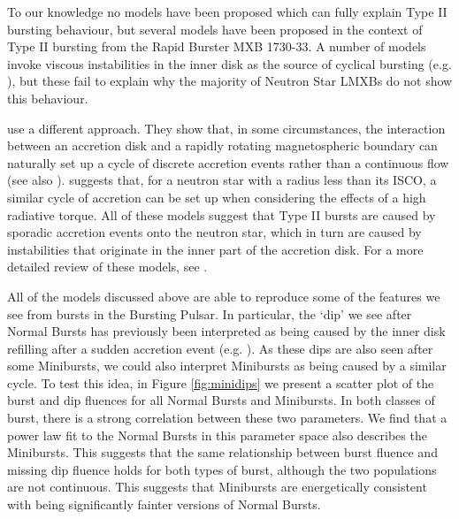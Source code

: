 \par To our knowledge no models have been proposed which can fully explain Type II bursting behaviour, but several models have been proposed in the context of Type II bursting from the Rapid Burster MXB 1730-33.  A number of models invoke viscous instabilities in the inner disk as the source of cyclical bursting (e.g. \citealp{Taam_Evo,Hayakawa_Type2Mod}), but these fail to explain why the majority of Neutron Star LMXBs do not show this behaviour.
\par \citet{Spruit_Type2Mod} use a different approach.  They show that, in some circumstances, the interaction between an accretion disk and a rapidly rotating magnetospheric boundary can naturally set up a cycle of discrete accretion events rather than a continuous flow  (see also \citealp{Dangelo_Episodic1,Dangelo_Episodic2,vandenEijnden_RB,Scaringi_Gating}).  \citet{Walker_Type2Mod} suggests that, for a neutron star with a radius less than its ISCO, a similar cycle of accretion can be set up when considering the effects of a high radiative torque.  All of these models suggest that Type II bursts are caused by sporadic accretion events onto the neutron star, which in turn are caused by instabilities that originate in the inner part of the accretion disk.  For a more detailed review of these models, see \citet{Lewin_Bursts}.
\par All of the models discussed above are able to reproduce some of the features we see from bursts in the Bursting Pulsar.  In particular, the `dip' we see after Normal Bursts has previously been interpreted as being caused by the inner disk refilling after a sudden accretion event (e.g. \citealp{Younes_Expo}).  As these dips are also seen after some Minibursts, we could also interpret Minibursts as being caused by a similar cycle.  To test this idea, in Figure \ref{fig:minidips} we present a scatter plot of the burst and dip fluences for all Normal Bursts and Minibursts.  In both classes of burst, there is a strong correlation between these two parameters.  We find that a power law fit to the Normal Bursts in this parameter space also describes the Minibursts.  This suggests that the same relationship between burst fluence and missing dip fluence holds for both types of burst, although the two populations are not continuous.  This suggests that Minibursts are energetically consistent with being significantly fainter versions of Normal Bursts.

